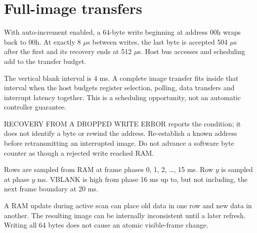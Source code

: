 \documentclass[10pt]{article}
\begin{document}
\section*{Full-image transfers}
With auto-increment enabled, a 64-byte write beginning at address 00h wraps back to 00h. At exactly 8 $\mu$s between writes, the last byte is accepted 504 $\mu$s after the first and its recovery ends at 512 $\mu$s. Host bus accesses and scheduling add to the transfer budget.

The vertical blank interval is 4 ms. A complete image transfer fits inside that interval when the host budgets register selection, polling, data transfers and interrupt latency together. This is a scheduling opportunity, not an automatic controller guarantee.
\begin{Notice}{RECOVERY FROM A DROPPED WRITE}
ERROR reports the condition; it does not identify a byte or rewind the address. Re-establish a known address before retransmitting an interrupted image. Do not advance a software byte counter as though a rejected write reached RAM.
\end{Notice}
\vfill{}
\clearpage
{}
Rows are sampled from RAM at frame phases 0, 1, 2, \ldots, 15 ms. Row $y$ is sampled at phase $y$ ms. VBLANK is high from phase 16 ms up to, but not including, the next frame boundary at 20 ms.
\begin{center}
\end{center}
A RAM update during active scan can place old data in one row and new data in another. The resulting image can be internally inconsistent until a later refresh. Writing all 64 bytes does not cause an atomic visible-frame change.
\end{document}
